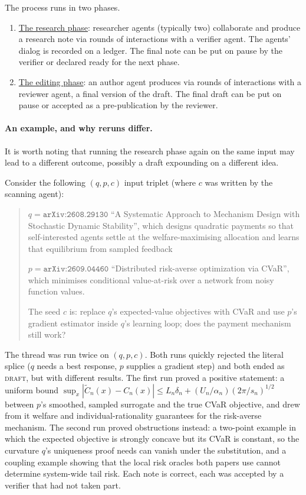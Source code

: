 \documentclass[11pt,a4paper]{article}
\begin{document}
The process runs in two phases.
\begin{enumerate}
\item \underline{The research phase}: researcher agents (typically two) collaborate and
produce a research note via rounds of interactions with a verifier agent. 
The agents' dialog is recorded on a ledger. The final 
note can be put on pause by the verifier or declared ready for the next
phase. 

\item \underline{The editing phase}: 
an author agent produces via rounds of
interactions with a reviewer agent, a final version of the draft.
The final draft can be put on pause or accepted as a pre-publication 
by the reviewer.
\end{enumerate}

\paragraph{An example, and why reruns differ.}
It is worth noting that 
running the research phase again on the same input may lead to a different
outcome, possibly a draft expounding on a different idea. 

Consider the following $(q,p,c)$ input triplet (where $c$ was written by the scanning agent):

\begin{quote}
$q=\texttt{arXiv:2608.29130}$ ``A Systematic Approach to Mechanism Design with Stochastic Dynamic
Stability'', which designs quadratic payments so
that self-interested agents settle at the welfare-maximising allocation and
learns that equilibrium from sampled feedback

$p=\texttt{arXiv:2609.04460}$ ``Distributed
risk-averse optimization via CVaR'', which minimises
conditional value-at-risk over a network from noisy function values. 

The seed $c$ is: 
replace $q$'s expected-value objectives with
CVaR and use $p$'s gradient estimator inside $q$'s learning loop; does the
payment mechanism still work?
\end{quote}

The thread was run twice on $(q,p,c)$. Both runs quickly rejected the
literal splice ($q$ needs a best response, $p$ supplies a gradient step) and
both ended as \textsc{draft}, but with different results. The first run
proved a positive statement: a uniform bound
\(
\sup_x |\widetilde C_n(x) - C_n(x)| \le L_n\delta_n + (U_n/\alpha_n)(2\pi/s_n)^{1/2}
\)
between $p$'s smoothed, sampled surrogate and the true CVaR objective, and
drew from it welfare and individual-rationality guarantees for the
risk-averse mechanism. The second run proved obstructions instead: a
two-point example in which the expected objective is strongly concave but
its CVaR is constant, so the curvature $q$'s uniqueness proof needs can
vanish under the substitution, and a coupling example showing that the
local risk oracles both papers use cannot determine system-wide tail risk.
Each note is correct, each was accepted by a verifier that had not taken
part.
\end{document}
